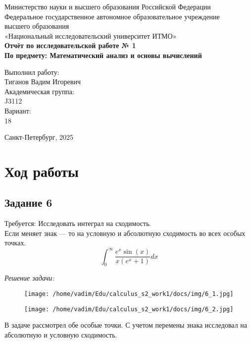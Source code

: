\documentclass[a4paper,12pt]{article}
\begin{document}
\thispagestyle{empty}
\begin{center}
    \large
    Министерство науки и высшего образования Российской Федерации\\
    Федеральное государственное автономное образовательное учреждение\\
    высшего образования\\
    «Национальный исследовательский университет ИТМО»\\
    \vspace{5cm}
    \textbf{Отчёт по исследовательской работе № 1}\\
    \textbf{По предмету: Математический анализ и основы вычислений}\\
    \vspace{6cm}
    \begin{flushright}
        Выполнил работу:\\ Тиганов Вадим Игоревич\\
        \vspace{1cm}
        Академическая группа: \\ J3112\\
        \vspace{1cm}
        Вариант: \\18
    \end{flushright}
    \vspace{1cm}
    \vspace{3cm}
    \begin{center}
        Санкт-Петербург, 2025\\
    \end{center}
\end{center}

\newpage


\section{Ход работы}


\subsection{Задание 6}

Требуется:
Исследовать интеграл на сходимость.\\
Если меняет знак --- то на условную и абсолютную сходимость во всех особых точках.
\[
\int_{0}^{\infty} \frac{e^x \sin(x)}{x(e^x + 1)} dx
\]

\emph{Решение задачи:}

\begin{figure}[H]
    \centering
    \texttt{[image: /home/vadim/Edu/calculus\_s2\_work1/docs/img/6\_1.jpg]}
    \label{fig:integral}
\end{figure}

\begin{figure}[H]
    \centering
    \texttt{[image: /home/vadim/Edu/calculus\_s2\_work1/docs/img/6\_2.jpg]}
    \label{fig:integral}
\end{figure}

В задаче рассмотрел обе особые точки. С учетом перемены знака исследовал на абсолютную и условную сходимость.
\end{document}
